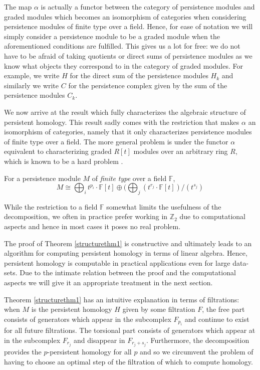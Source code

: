 The map $\alpha$ is actually a functor between the category of persistence modules and graded modules \cite{ghirst} which becomes an isomorphism of categories when considering persistence modules of finite type over a field. Hence, for ease of notation we will simply consider a persistence module to be a graded module when the aforementioned conditions are fulfilled. This gives us a lot for free: we do not have to be afraid of taking quotients or direct sums of persistence modules as we know what objects they correspond to in the category of graded modules. For example, we write $H$ for the direct sum of the persistence modules $H_{k}$ and similarly we write $C$ for the persistence complex given by the sum of the persistence modules $C_{k}$.

We now arrive at the result which fully characterizes the algebraic structure of persistent homology. This result sadly comes with the restriction that makes $\alpha$ an isomorphism of categories, namely that it only characterizes persistence modules of finite type over a field. The more general problem is under the functor $\alpha$ equivalent to characterizing graded $R[t]$ modules over an arbitrary ring $R$, which is known to be a hard problem \cite{ghirst}.
\begin{theorem} \label{structurethm1}
  For a persistence module $M$ of \textit{finite type} over a field $\mathbb{F}$,
  \[M \cong \bigoplus_{i} t^{p_{i}} \cdot \mathbb{F}[t] \oplus (\bigoplus_{j} (t^{r_{j}} \cdot \mathbb{F}[t]) / (t^{s_{j}}) \]

\end{theorem}

While the restriction to a field $\mathbb{F}$ somewhat limits the usefulness of the decomposition, we often in practice prefer working in $\mathbb{Z}_{2}$ due to computational aspects and hence in most cases it poses no real problem.

The proof of Theorem \ref{structurethm1} is constructive and ultimately leads to an algorithm for computing persistent homology in terms of linear algebra. Hence, persistent homology is computable in practical applications even for large data-sets. Due to the intimate relation between the proof and the computational aspects we will give it an appropriate treatment in the next section.

Theorem \ref{structurethm1} has an intuitive explanation in terms of filtrations: when $M$ is the persistent homology $H$ given by some filtration $F$, the free part consists of generators which appear in the subcomplex $F_{p_{i}}$ and continue to exist for all future filtrations. The torsional part consists of generators which appear at in the subcomplex $F_{r_{j}}$ and disappear in  $F_{r_{j}+s_{j}}$. Furthermore, the decomposition provides the $p$-persistent homology for all $p$ and so we circumvent the problem of having to choose an optimal step of the filtration of which to compute homology.

